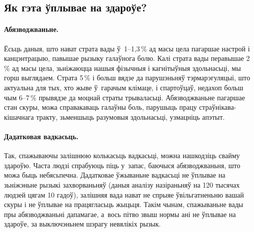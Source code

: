 \subsection{Як гэта ўплывае на здароўе?}

\paragraph{Абязводжваньне.}
Ёсьць даныя, што нават страта вады ў~1--1,3\,\% ад масы цела пагаршае настрой і канцэнтрацыю, павышае рызыку галаўнога болю. Калі страта вады перавышае 2\,\% ад масы цела, зьніжаюцца нашыя фізычныя і кагнітыўныя здольнасьці, мы горш выглядаем. Страта 5\,\% і больш вядзе да парушэньняў тэрмарэгуляцыі, што актуальна для тых, хто жыве ў~гарачым клімаце, і спартоўцаў, недахоп больш чым 6--7\,\% прывядзе да моцнай страты трываласьці. Абязводжваньне пагаршае стан скуры, можа справакаваць галаўны боль, парушыць працу страўнікава-кішачнага тракту, зьменшыць разумовыя здольнасьці, узмацніць апэтыт.


\paragraph{Дадатковая вадкасьць.}
Так, спажываючы залішнюю колькасьць вадкасьці, можна нашкодзіць свайму здароўю. Часта людзі спрабуюць піць у~запас, баючыся абязводжваньня, што можа быць небясьпечна. Дадатковае ўжываньне вадкасьці не ўплывае на зьніжэньне рызыкі захворваньняў (даныя аналізу назіраньняў на 120 тысячах людзей цягам 10 гадоў), залішняя вада нават не спрыяе ўвільгатненьню вашай скуры і не ўплывае на працягласьць жыцьця. Такім чынам, спажываньне вады пры абязводжваньні дапамагае, а~вось пітво звыш нормы ані не ўплывае на здароўе, за выключэньнем шэрагу невялікіх рызык.

